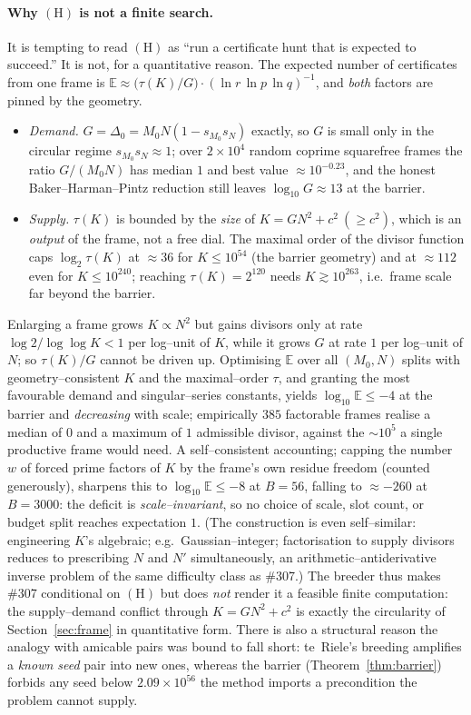 \documentclass[11pt]{article}
\theoremstyle{definition}
\begin{document}
\paragraph{Why $(\mathrm{H})$ is not a finite search.} It is tempting to read $(\mathrm{H})$ as
``run a certificate hunt that is expected to succeed.'' It is not, for a quantitative reason. The
expected number of certificates from one frame is $\mathbb{E}\approx
\bigl(\tau(K)/G\bigr)\cdot(\ln r\,\ln p\,\ln q)^{-1}$, and \emph{both} factors are pinned by the
geometry.
\begin{itemize}[leftmargin=1.4em]
\item \emph{Demand.} $G=\Delta_0=M_0N(1-s_{M_0}s_N)$ exactly, so $G$ is small only in the circular
regime $s_{M_0}s_N\approx1$; over $2\times10^4$ random coprime squarefree frames the ratio
$G/(M_0N)$ has median $1$ and best value $\approx10^{-0.23}$, and the honest Baker--Harman--Pintz
reduction still leaves $\log_{10}G\approx13$ at the barrier.
\item \emph{Supply.} $\tau(K)$ is bounded by the \emph{size} of $K=GN^2+c^2\ (\ge c^2)$, which is an
\emph{output} of the frame, not a free dial. The maximal order of the divisor function
\cite[Thm.~317]{HardyWright} caps $\log_2\tau(K)$ at $\approx36$ for $K\le10^{54}$ (the barrier
geometry) and at $\approx112$ even for $K\le10^{240}$; reaching $\tau(K)=2^{120}$ needs
$K\gtrsim10^{263}$, i.e.\ frame scale far beyond the barrier.
\end{itemize}
Enlarging a frame grows $K\propto N^2$ but gains divisors only at rate $\log2/\log\log K<1$ per
log--unit of $K$, while it grows $G$ at rate $1$ per log--unit of $N$; so $\tau(K)/G$ cannot be
driven up. Optimising $\mathbb{E}$ over all $(M_0,N)$ splits with geometry--consistent $K$ and the
maximal--order $\tau$, and granting the most favourable demand and singular--series constants, yields
$\log_{10}\mathbb{E}\le-4$ at the barrier and \emph{decreasing} with scale; empirically $385$
factorable frames realise a median of $0$ and a maximum of $1$ admissible divisor, against the
$\sim10^{5}$ a single productive frame would need. A self--consistent accounting; capping the
number $w$ of forced prime factors of $K$ by the frame's own residue freedom (counted generously),
sharpens this to $\log_{10}\mathbb{E}\le-8$ at $B=56$, falling to $\approx-260$ at $B=3000$: the
deficit is \emph{scale--invariant}, so no choice of scale, slot count, or budget split reaches
expectation $1$. (The construction is even self--similar: engineering $K$'s algebraic; e.g.\
Gaussian--integer; factorisation to supply divisors reduces to prescribing $N$ and $N'$
simultaneously, an arithmetic--antiderivative inverse problem of the same difficulty class as \#307.)
The breeder thus makes \#307 conditional on $(\mathrm{H})$ but does \emph{not} render it a feasible
finite computation: the supply--demand conflict through $K=GN^2+c^2$ is exactly the circularity of
Section~\ref{sec:frame} in quantitative form. There is also a structural reason the analogy with
amicable pairs was bound to fall short: te~Riele's breeding amplifies a \emph{known seed} pair into
new ones, whereas the barrier (Theorem~\ref{thm:barrier}) forbids any seed below $2.09\times10^{56}$
the method imports a precondition the problem cannot supply.
\end{document}
